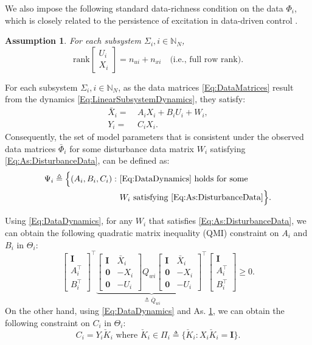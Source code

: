 \documentclass[letterpaper, 10 pt, conference]{ieeeconf}%
\newcommand{\N}{\mathbb{N}}
\newcommand{\T}{\top}
\newcommand{\I}{\mathbf{I}}
\newcommand{\0}{\mathbf{0}}
\newcommand{\bm}[1]{\begin{bmatrix}#1\end{bmatrix}}
\newtheorem{assumption}{\textbf{Assumption}}
\begin{document}
We also impose the following standard data-richness condition on the data $\Phi_i$, which is closely related to the persistence of excitation in data-driven control \cite{de2019formulas}.

\begin{assumption}\label{As:PersistenceOfExcitation}
For each subsystem $\Sigma_i, i\in\N_N$, 
$$
\text{rank} \bm{ U_i \\ X_i } = n_{ui} + n_{xi} \quad \mbox{(i.e., full row rank)}.
$$
\end{assumption}

For each subsystem $\Sigma_i, i\in\N_N$, as the data matrices \eqref{Eq:DataMatrices} result from the dynamics \eqref{Eq:LinearSubsystemDynamics}, they satisfy:
\begin{equation}\label{Eq:DataDynamics}
\begin{aligned}
\bar{X}_i =&\ A_i X_i + B_i U_i + W_i,\\
Y_i =&\ C_i X_i.
\end{aligned}
\end{equation}
Consequently, the set of model parameters that is consistent under the observed data matrices $\bar{\Phi}_i$ for some disturbance data matrix $W_i$ satisfying \eqref{Eq:As:DisturbanceData}, can be defined as:
\begin{equation}
\begin{aligned}
\Psi_i \triangleq \Big\{(A_i,B_i,C_i):\ &\eqref{Eq:DataDynamics} \mbox{ holds for some } \\
&W_i \mbox{ satisfying } \eqref{Eq:As:DisturbanceData}\Big\}.
\end{aligned}   
\end{equation}


Using \eqref{Eq:DataDynamics}, for any $W_i$ that satisfies \eqref{Eq:As:DisturbanceData}, we can obtain the following quadratic matrix inequality (QMI) constraint on $A_i$ and $B_i$ in $\Theta_i$:
\begin{equation}\label{Eq:QMIonParameters}
\bm{\I \\ A_i^\T \\ B_i^\T}^\T \underbrace{\bm{\I & \bar{X}_i \\ \0 & -X_i \\ \0 & -U_i} Q_{wi} \bm{\I & \bar{X}_i \\ \0 & -X_i \\ \0 & -U_i}^\T}_{\triangleq \bar{Q}_{wi}} \bm{\I \\ A_i^\T \\ B_i^\T} \geq 0.
\end{equation}
On the other hand, using \eqref{Eq:DataDynamics} and As. \ref{As:PersistenceOfExcitation}, we can obtain the following constraint on $C_i$ in $\Theta_i$:  
\begin{equation}\label{Eq:EqualityConstraintOnC}
C_i = Y_i \check{K}_i \mbox{ where } \check{K}_i \in \Pi_i \triangleq\{\check{K}_i : X_i \check{K}_i = \I\}. 
\end{equation}
\end{document}
